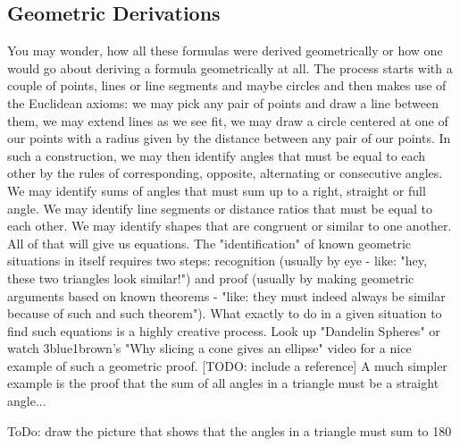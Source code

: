 \subsection{Geometric Derivations}
You may wonder, how all these formulas were derived geometrically or how one would go about deriving a formula geometrically at all. The process starts with a couple of points, lines or line segments and maybe circles and then makes use of the Euclidean axioms: we may pick any pair of points and draw a line between them, we may extend lines as we see fit, we may draw a circle centered at one of our points with a radius given by the distance between any pair of our points. In such a construction, we may then identify angles that must be equal to each other by the rules of corresponding, opposite, alternating or consecutive angles. We may identify sums of angles that must sum up to a right, straight or full angle. We may identify line segments or distance ratios that must be equal to each other. We may identify shapes that are congruent or similar to one another. All of that will give us equations. The "identification" of known geometric situations in itself requires two steps: recognition (usually by eye - like: "hey, these two triangles look similar!") and proof (usually by making geometric arguments based on known theorems - "like: they must indeed always be similar because of such and such theorem"). What exactly to do in a given situation to find such equations is a highly creative process. Look up "Dandelin Spheres" or watch 3blue1brown's "Why slicing a cone gives an ellipse" video for a nice example of such a geometric proof. [TODO: include a reference] A much simpler example is the proof that the sum of all angles in a triangle must be a straight angle...


ToDo: draw the picture that shows that the angles in a triangle must sum to 180






